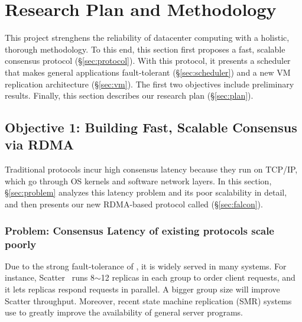 \vspace{-.15in}\section{Research Plan and Methodology}
\label{sec:rep}\vspace{-.075in}

This \xxx project strenghens the reliability of datacenter computing with a 
holistic, thorough methodology. To this end, this section first proposes a 
fast, scalable consensus protocol (\S\ref{sec:protocol}). With this protocol, 
it presents a scheduler that makes general applications fault-tolerant 
(\S\ref{sec:scheduler}) and a new VM replication architecture (\S\ref{sec:vm}). 
The first two objectives include preliminary results. Finally, this section 
describes our research plan (\S\ref{sec:plan}).

\vspace{-.15in}\subsection{Objective 1: Building Fast, Scalable Consensus via
RDMA} 
\label{sec:model}\vspace{-.075in}

Traditional \paxos protocols incur high consensus latency because they run on 
TCP/IP, which go through OS kernels and software network layers. In this 
section, \S\ref{sec:problem} analyzes this latency problem and its poor 
scalability in detail, and then presents our new RDMA-based \paxos 
protocol called \falcon (\S\ref{sec:falcon}).

\vspace{-.15in}\subsubsection{Problem: Consensus Latency of existing \paxos 
protocols scale poorly} 
\label{sec:examples}\vspace{-.075in}

Due to the strong fault-tolerance of \paxos, it is widely served in many 
systems. For instance, Scatter~\cite{scatter:sosp11} runs 8$\sim$12 replicas in 
each \paxos group to order client requests, and it lets replicas respond 
requests in parallel. A bigger group size will improve Scatter throughput. 
Moreover, recent state machine replication (SMR) 
systems~\cite{eve:osdi12,rex:eurosys14,crane:sosp15} use \paxos to greatly 
improve the availability of
general server programs.

